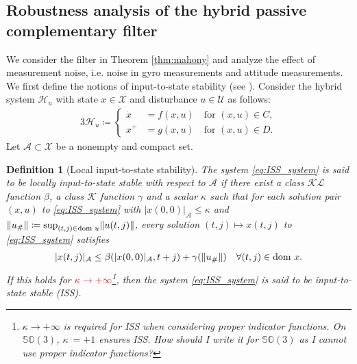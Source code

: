\documentclass{article}
\DeclarePairedDelimiter{\norm}{\lVert}{\rVert}
\newcommand{\dom}{\text{dom }}
\newcommand{\SOthree}{\mathbb{SO}(3)}
\newtheorem{definition}{Definition}
\begin{document}
\subsection{Robustness analysis of the hybrid passive complementary filter}
We consider the filter in Theorem \ref{thm:mahony} and analyze the effect of measurement noise, i.e. noise in gyro measurements and attitude measurements. We first define the notions of input-to-state stability (see \cite{Cai_and_Teel, Khalil}).  Consider the hybrid system $\mathcal{H}_u$ with state $x\in\mathcal{X}$ and disturbance $u\in\mathcal{U}$ as follows:
\begin{alignat}{3}\label{eq:ISS_system}
    \mathcal{H}_u\coloneqq \begin{cases}
        \dot{x} &= f(x,u) \quad \text{for }(x,u)\in C,\\
        x^+ &= g(x,u) \quad \text{for }(x,u)\in D.
    \end{cases}
\end{alignat}
Let $\mathcal{A}\subset\mathcal{X}$ be a nonempty and compact set. 

\begin{definition}[{Local input-to-state stability}]
    The system  \eqref{eq:ISS_system} is said to be locally input-to-state stable with respect to $\mathcal{A}$ if there exist a class $\mathcal{KL}$ function $\beta$, a class $\mathcal{K}$ function $\gamma$ and a scalar $\kappa$ such that for each solution pair $(x,u)$ to \eqref{eq:ISS_system} with $|{x(0,0)}|_\mathcal{A}\leq \kappa$ and  $\norm{u_{\#}}\coloneqq  \sup_{(t,j)\in \dom u} \norm{u(t,j)}$, every solution $(t,j)\mapsto x(t,j)$ to \eqref{eq:ISS_system} satisfies
    \begin{align*}
        |x(t,j)|_\mathcal{A}\leq \beta(|x(0,0)|_\mathcal{A}, t+j) + \gamma(\norm{u_{\#}}) \quad \forall (t,j)\in \dom x.
    \end{align*}
    If this holds for \textcolor{red}{$\kappa \to +\infty$}\footnote{$\kappa\to+\infty$ is required for ISS when considering proper indicator functions. On $\SOthree$, $\kappa\ = +1$ ensures ISS. How should I write it for $\SOthree$ as I cannot use proper indicator functions?}, then the system \eqref{eq:ISS_system} is said to be input-to-state stable (ISS). 
\end{definition}
\end{document}
